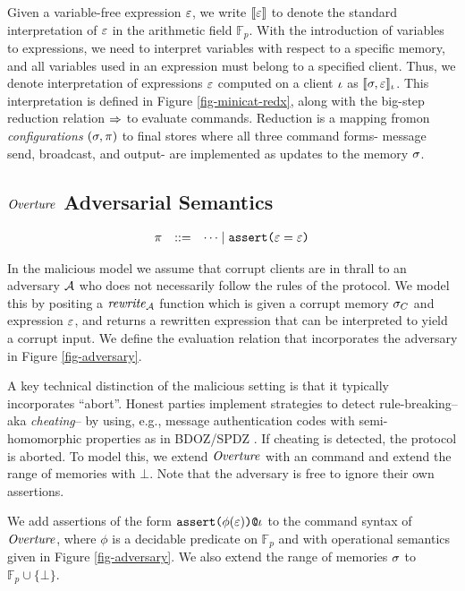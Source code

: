 Given a variable-free expression $\varepsilon$, we write $\llbracket \varepsilon \rrbracket$ to denote
the standard interpretation of $\varepsilon$ in the arithmetic field
$\mathbb{F}_{p}$. With the introduction of variables to expressions,
we need to interpret variables with respect to a specific memory, and
all variables used in an expression must belong to a specified client.
Thus, we denote interpretation of expressions $\varepsilon$ computed on a
client $\iota$ as $\llbracket \sigma,\varepsilon \rrbracket_{\iota}$. This interpretation is
defined in Figure \ref{fig-minicat-redx}, along with the big-step
reduction relation $\Rightarrow$ to evaluate commands. Reduction is a mapping
fromon \emph{configurations} $(\sigma,\pi)$ to final stores
where all three command forms- message send, broadcast, and
output- are implemented as updates to the memory $\sigma$. 

\subsection{$\mathit{Overture}$ Adversarial Semantics}

$$
    \begin{array}{rcl@{\hspace{2mm}}r}
      \prog &::=& \cdots \mid \assert{\be = \be}
    \end{array}
$$
    
\minicataredxfig

In the malicious model we assume that corrupt clients are in
thrall to an adversary $\mathcal{A}$ who does not necessarily follow
the rules of the protocol.  We model this by positing a $\mathit{rewrite}_{\mathcal{A}}$
function which is given a corrupt memory $\sigma_C$ and expression
$\varepsilon$, and returns a rewritten expression that can be interpreted to
yield a corrupt input. We define the evaluation relation that
incorporates the adversary in Figure \ref{fig-adversary}.

A key technical distinction of the malicious setting is that it
typically incorporates ``abort''. Honest parties implement strategies
to detect rule-breaking-- aka \emph{cheating}-- by using, e.g.,
message authentication codes with semi-homomorphic properties as in
BDOZ/SPDZ \cite{10.1007/978-3-030-68869-1_3}. If cheating is detected,
the protocol is aborted. To model this, we extend $\mathit{Overture}$ with an
 command and extend the range of memories with
$\bot$. Note that the adversary is free to ignore their own
assertions.
\begin{definition}
  We add assertions of the form $\texttt{assert(}\phi(\varepsilon)\texttt{)}\texttt{@}\iota$ to the command
  syntax of $\mathit{Overture}$, where $\phi$ is a decidable predicate on
  $\mathbb{F}_p$ and with operational semantics given in Figure
  \ref{fig-adversary}. We also extend the range of memories $\sigma$
  to $\mathbb{F}_p \cup \{ \bot \}$.
\end{definition}
